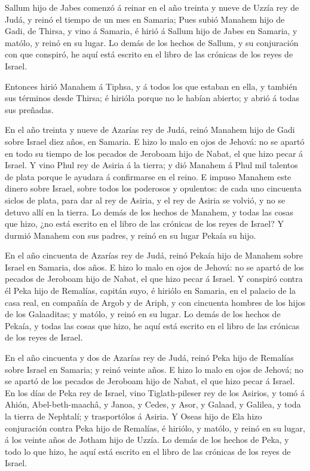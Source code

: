  Sallum hijo de Jabes comenzó á reinar en el año treinta y
nueve de Uzzía rey de Judá, y reinó el tiempo de un mes en Samaria;
 Pues subió Manahem hijo de Gadi, de Thirsa, y vino á
Samaria, é hirió á Sallum hijo de Jabes en Samaria, y matólo, y reinó en
su lugar.  Lo demás de los hechos de Sallum, y su
conjuración con que conspiró, he aquí está escrito en el libro de las
crónicas de los reyes de Israel.

 Entonces hirió Manahem á Tiphsa, y á todos los que estaban
en ella, y también sus términos desde Thirsa; é hirióla porque no le
habían abierto; y abrió á todas sus preñadas.

 En el año treinta y nueve de Azarías rey de Judá, reinó
Manahem hijo de Gadi sobre Israel diez años, en Samaria.  E
hizo lo malo en ojos de Jehová: no se apartó en todo su tiempo de los
pecados de Jeroboam hijo de Nabat, el que hizo pecar á Israel.
 Y vino Phul rey de Asiria á la tierra; y dió Manahem á
Phul mil talentos de plata porque le ayudara á confirmarse en el reino.
 E impuso Manahem este dinero sobre Israel, sobre todos los
poderosos y opulentos: de cada uno cincuenta siclos de plata, para dar
al rey de Asiria, y el rey de Asiria se volvió, y no se detuvo allí en
la tierra.  Lo demás de los hechos de Manahem, y todas las
cosas que hizo, ¿no está escrito en el libro de las crónicas de los
reyes de Israel?  Y durmió Manahem con sus padres, y reinó
en su lugar Pekaía su hijo.

 En el año cincuenta de Azarías rey de Judá, reinó Pekaía
hijo de Manahem sobre Israel en Samaria, dos años.  E hizo
lo malo en ojos de Jehová: no se apartó de los pecados de Jeroboam hijo
de Nabat, el que hizo pecar á Israel.  Y conspiró contra él
Peka hijo de Remalías, capitán suyo, é hiriólo en Samaria, en el palacio
de la casa real, en compañía de Argob y de Ariph, y con cincuenta
hombres de los hijos de los Galaaditas; y matólo, y reinó en su lugar.
 Lo demás de los hechos de Pekaía, y todas las cosas que
hizo, he aquí está escrito en el libro de las crónicas de los reyes de
Israel.

 En el año cincuenta y dos de Azarías rey de Judá, reinó
Peka hijo de Remalías sobre Israel en Samaria; y reinó veinte años.
 E hizo lo malo en ojos de Jehová; no se apartó de los
pecados de Jeroboam hijo de Nabat, el que hizo pecar á Israel.
 En los días de Peka rey de Israel, vino Tiglath-pileser
rey de los Asirios, y tomó á Ahión, Abel-beth-maachâ, y Janoa, y Cedes,
y Asor, y Galaad, y Galilea, y toda la tierra de Nephtalí; y
trasportólos á Asiria.  Y Oseas hijo de Ela hizo
conjuración contra Peka hijo de Remalías, é hiriólo, y matólo, y reinó
en su lugar, á los veinte años de Jotham hijo de Uzzía.  Lo
demás de los hechos de Peka, y todo lo que hizo, he aquí está escrito en
el libro de las crónicas de los reyes de Israel.

